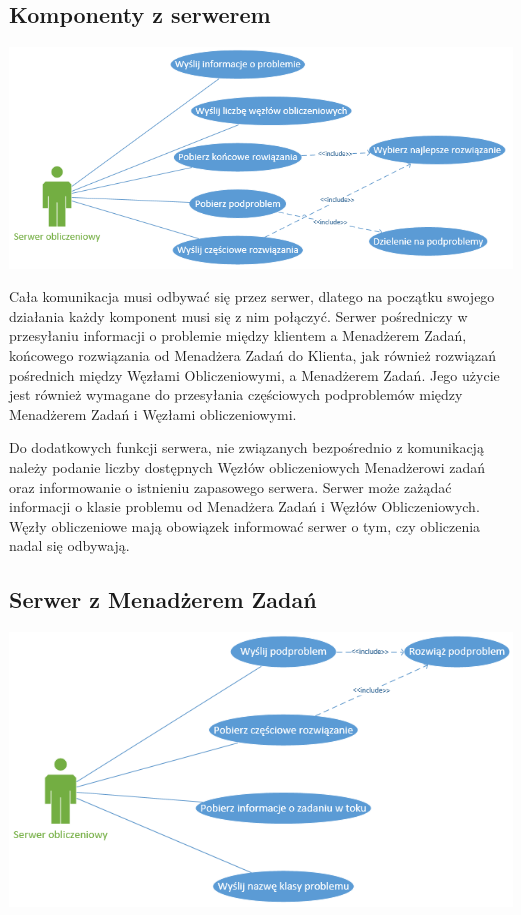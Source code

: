 \documentclass[12pt,a4paper,titlepage]{report}
\begin{document}
			\subsection{Komponenty z serwerem}
			
			\includegraphics[width=\textwidth]{img/diagram05.png}	
			
			Cała komunikacja musi odbywać się przez serwer, dlatego na początku swojego działania każdy komponent musi się z nim połączyć. Serwer pośredniczy w przesyłaniu informacji o problemie między klientem a Menadżerem Zadań, końcowego rozwiązania od Menadżera Zadań do Klienta, jak również rozwiązań pośrednich między Węzłami Obliczeniowymi, a Menadżerem Zadań. Jego użycie jest również wymagane do przesyłania częściowych podproblemów między Menadżerem Zadań i Węzłami obliczeniowymi.
			
			Do dodatkowych funkcji serwera, nie związanych bezpośrednio z komunikacją należy podanie liczby dostępnych Węzłów obliczeniowych Menadżerowi zadań oraz informowanie o istnieniu zapasowego serwera. Serwer może zażądać informacji o klasie problemu od Menadżera Zadań i Węzłów Obliczeniowych. Węzły obliczeniowe mają obowiązek informować serwer o tym, czy obliczenia nadal się odbywają.
			\subsection{Serwer z Menadżerem Zadań}
			
			\includegraphics{img/diagram06.png}	
			
\end{document}
